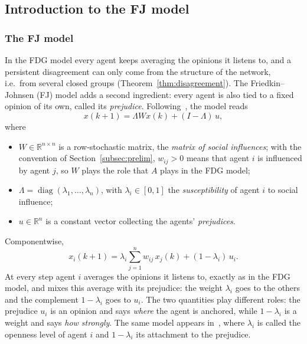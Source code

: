 \subsection{Introduction to the FJ model}
\label{subsec:fj-intro}

\subsubsection{The FJ model}
\label{subsubsec:fj-model}

In the FDG model every agent keeps averaging the opinions it listens to, and a
persistent disagreement can only come from the structure of the network, i.e.\ from
several closed groups (Theorem~\ref{thm:disagreement}). The Friedkin--Johnsen (FJ)
model adds a second ingredient: every agent is also tied to a fixed opinion of its own,
called its \emph{prejudice}. Following~\cite{proskurnikov2017tutorial}, the model reads
\begin{equation}\label{eq:fj}
  x(k+1) = \Lambda W x(k) + (I - \Lambda)\, u ,
\end{equation}
where
\begin{itemize}
  \item $W \in \mathbb{R}^{n \times n}$ is a row-stochastic matrix, the \emph{matrix of
        social influences}; with the convention of Section~\ref{subsec:prelim},
        $w_{ij} > 0$ means that agent $i$ is influenced by agent $j$, so $W$ plays the
        role that $A$ plays in the FDG model;
  \item $\Lambda = \operatorname{diag}(\lambda_1, \dots, \lambda_n)$, with
        $\lambda_i \in [0,1]$ the \emph{susceptibility} of agent $i$ to social
        influence;
  \item $u \in \mathbb{R}^n$ is a constant vector collecting the agents'
        \emph{prejudices}.
\end{itemize}
Componentwise,
\begin{equation}\label{eq:fj-i}
  x_i(k+1) = \lambda_i \sum_{j=1}^{n} w_{ij}\, x_j(k) + (1 - \lambda_i)\, u_i .
\end{equation}
At every step agent $i$ averages the opinions it listens to, exactly as in the FDG
model, and mixes this average with its prejudice: the weight $\lambda_i$ goes to the
others and the complement $1 - \lambda_i$ goes to $u_i$. The two quantities play
different roles: the prejudice $u_i$ is an opinion and says \emph{where} the agent is
anchored, while $1 - \lambda_i$ is a weight and says \emph{how strongly}. The same
model appears in~\cite{bullo2024lns}, where $\lambda_i$ is called the openness level of
agent $i$ and $1 - \lambda_i$ its attachment to the prejudice.

